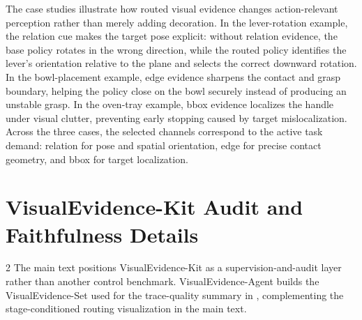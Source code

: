 The case studies illustrate how routed visual evidence changes action-relevant perception rather than merely adding decoration. In the lever-rotation example, the relation cue makes the target pose explicit: without relation evidence, the base policy rotates in the wrong direction, while the routed policy identifies the lever's orientation relative to the plane and selects the correct downward rotation. In the bowl-placement example, edge evidence sharpens the contact and grasp boundary, helping the policy close on the bowl securely instead of producing an unstable grasp. In the oven-tray example, bbox evidence localizes the handle under visual clutter, preventing early stopping caused by target mislocalization. Across the three cases, the selected channels correspond to the active task demand: relation for pose and spatial orientation, edge for precise contact geometry, and bbox for target localization.


\section{VisualEvidence-Kit Audit and Faithfulness Details}
\label{subsec:VisualEvidence-Kit Audit and Faithfulness Details}

\begin{multicols}{2}
The main text positions VisualEvidence-Kit as a supervision-and-audit layer rather than another control benchmark. VisualEvidence-Agent builds the VisualEvidence-Set used for the trace-quality summary in , complementing the stage-conditioned routing visualization in the main text.

\columnbreak

\noindent\begin{minipage}{\columnwidth}
\centering
\scriptsize
\setlength{\tabcolsep}{3pt}
\label{tab:evidence_trace}
\end{minipage}
\end{multicols}

